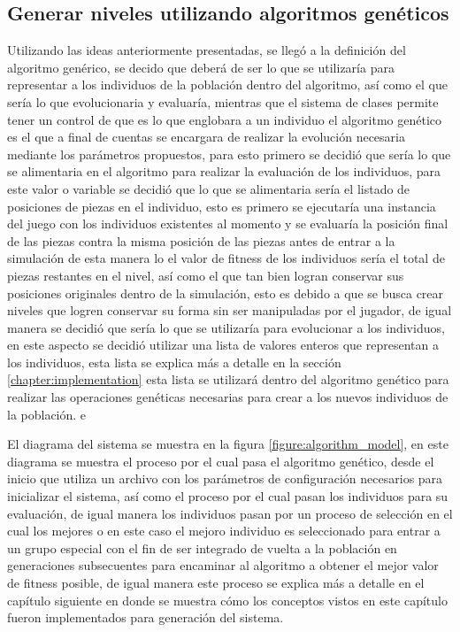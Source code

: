 \subsection{Generar niveles utilizando algoritmos genéticos}
\label{subsection:generate-levels-using-GA}

Utilizando las ideas anteriormente presentadas, se llegó a la definición del
algoritmo genérico, se decido que deberá de ser lo que se utilizaría para
representar a los individuos de la población dentro del algoritmo, así como el
que sería lo que evolucionaria y evaluaría, mientras que el sistema de clases
permite tener un control de que es lo que englobara a un individuo el algoritmo
genético es el que a final de cuentas se encargara de realizar la evolución
necesaria mediante los parámetros propuestos, para esto primero se decidió que
sería lo que se alimentaria en el algoritmo para realizar la evaluación de los
individuos, para este valor o variable se decidió que lo que se alimentaria
sería el listado de posiciones de piezas en el individuo, esto es primero se
ejecutaría una instancia del juego con los individuos existentes al momento y se
evaluaría la posición final de las piezas contra la misma posición de las piezas
antes de entrar a la simulación de esta manera lo el valor de fitness de los
individuos sería el total de piezas restantes en el nivel, así como el que tan
bien logran conservar sus posiciones originales dentro de la simulación, esto es
debido a que se busca crear niveles que logren conservar su forma sin ser
manipuladas por el jugador, de igual manera se decidió que sería lo que se
utilizaría para evolucionar a los individuos, en este aspecto se decidió
utilizar una lista de valores enteros que representan a los individuos, esta
lista se explica más a detalle en la sección \ref{chapter:implementation} esta
lista se utilizará dentro del algoritmo genético para realizar las operaciones
genéticas necesarias para crear a los nuevos individuos de la población. e

El diagrama del sistema se muestra en la figura \ref{figure:algorithm_model}, en
este diagrama se muestra el proceso por el cual pasa el algoritmo genético, desde
el inicio que utiliza un archivo con los parámetros de configuración necesarios
para inicializar el sistema, así como el proceso por el cual pasan los
individuos para su evaluación, de igual manera los individuos pasan por un
proceso de selección en el cual los mejores o en este caso el mejoro individuo
es seleccionado para entrar a un grupo especial con el fin de ser integrado de
vuelta a la población en generaciones subsecuentes para encaminar al algoritmo a
obtener el mejor valor de fitness posible, de igual manera este proceso se
explica más a detalle en el capítulo siguiente en donde se muestra cómo los
conceptos vistos en este capítulo fueron implementados para generación del
sistema.

